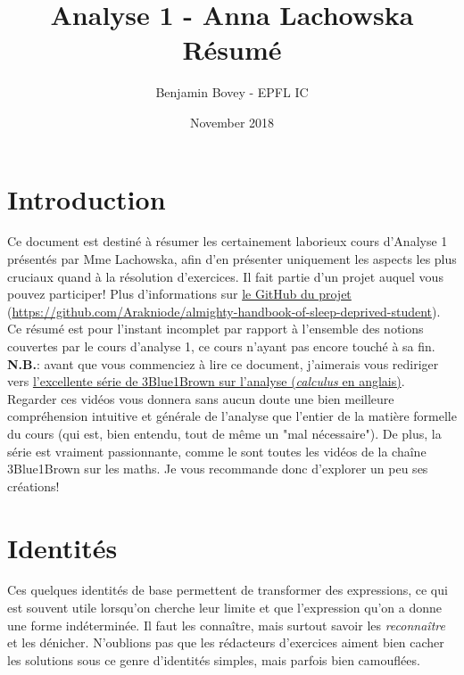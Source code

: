 \documentclass{article}
\title{\vspace{-1.5cm} Analyse 1 -  Anna Lachowska \\ Résumé}
\author{Benjamin Bovey - EPFL IC}
\date{November 2018}
\begin{document}
\maketitle

\section*{Introduction}
Ce document est destiné à résumer les certainement laborieux cours d'Analyse 1 présentés par Mme Lachowska, afin d'en présenter uniquement les aspects les plus cruciaux quand à la résolution d'exercices. Il fait partie d'un projet auquel vous pouvez participer! Plus d'informations sur \href{https://github.com/Arakniode/almighty-handbook-of-sleep-deprived-student}{le GitHub du projet} (\url{https://github.com/Arakniode/almighty-handbook-of-sleep-deprived-student}). \\
Ce résumé est pour l'instant incomplet par rapport à l'ensemble des notions couvertes par le cours d'analyse 1, ce cours n'ayant pas encore touché à sa fin. \\

\textbf{N.B.}: avant que vous commenciez à lire ce document, j'aimerais vous rediriger vers \href{https://www.youtube.com/playlist?list=PLZHQObOWTQDMsr9K-rj53DwVRMYO3t5Yr}{l'excellente série de 3Blue1Brown sur l'analyse (\emph{calculus} en anglais)}. Regarder ces vidéos vous donnera sans aucun doute une bien meilleure compréhension intuitive et générale de l'analyse que l'entier de la matière formelle du cours (qui est, bien entendu, tout de même un "mal nécessaire"). De plus, la série est vraiment passionnante, comme le sont toutes les vidéos de la chaîne 3Blue1Brown sur les maths. Je vous recommande donc d'explorer un peu ses créations!


\section{Identités}
Ces quelques identités de base permettent de transformer des expressions, ce qui est souvent utile lorsqu'on cherche leur limite et que l'expression qu'on a donne une forme indéterminée. Il faut les connaître, mais surtout savoir les \emph{reconnaître} et les dénicher. N'oublions pas que les rédacteurs d'exercices aiment bien cacher les solutions sous ce genre d'identités simples, mais parfois bien camouflées.
\end{document}
